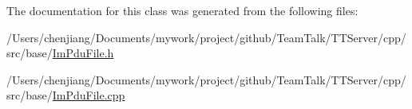 The documentation for this class was generated from the following files\+:\begin{DoxyCompactItemize}
\item 
/\+Users/chenjiang/\+Documents/mywork/project/github/\+Team\+Talk/\+T\+T\+Server/cpp/src/base/\hyperlink{_im_pdu_file_8h}{Im\+Pdu\+File.\+h}\item 
/\+Users/chenjiang/\+Documents/mywork/project/github/\+Team\+Talk/\+T\+T\+Server/cpp/src/base/\hyperlink{_im_pdu_file_8cpp}{Im\+Pdu\+File.\+cpp}\end{DoxyCompactItemize}
